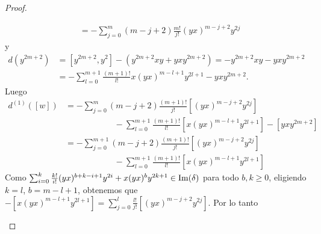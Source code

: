 \documentclass[fleqn,../tesis.tex]{subfiles}
\begin{document}
\begin{proof}
\begin{itemize}
\begin{align*}
				&= -\sum_{j = 0}^m(m - j + 2)\frac{m!}{j!}(yx)^{m -j + 2}y^{2j}
			\end{align*}
			y
			\begin{align*}
				d(y^{2m + 2}) &= \left[y^{2m + 2}, y^2\right] - (y^{2m +2}xy + yxy^{2m + 2}) = - y^{2m +2}xy - yxy^{2m + 2} \\
				&= -\sum_{l = 0}^{m + 1}\frac{(m + 1)!}{l!}x(yx)^{m - l + 1}y^{2l + 1} - yxy^{2m + 2}.
			\end{align*}
			Luego
			\begin{align*}
				d^{(1)}(\left[w\right]) &=
					-\sum_{j = 0}^m(m - j + 2)\frac{(m + 1)!}{j!}\left[(yx)^{m -j + 2}y^{2j}\right]\\
				&\hspace{70pt}-\sum_{l = 0}^{m + 1}\frac{(m + 1)!}{l!}\left[x(yx)^{m - l + 1}y^{2l + 1}\right]
						- \left[yxy^{2m + 2}\right]\\
				&= -\sum_{j = 0}^{m + 1}(m - j + 2)\frac{(m + 1)!}{j!}\left[(yx)^{m -j + 2}y^{2j}\right]\\
				& \hspace{70pt}-\sum_{l = 0}^{m + 1}\frac{(m + 1)!}{l!}\left[x(yx)^{m - l + 1}y^{2l + 1}\right]			
			\end{align*}
			Como $\sum_{i = 0}^k\frac{k!}{i!}(yx)^{b + k - i + 1}y^{2i} + x(yx)^by^{2k + 1} \in \operatorname{Im}(\delta)$
			para todo $b,k \geq 0$, eligiendo $k = l$, $b = m - l + 1$, obtenemos que
				$-\left[x(yx)^{m - l + 1}y^{2l + 1}\right]
					= \sum_{j = 0}^l\frac{l!}{j!}\left[(yx)^{m - j + 2}y^{2j}\right].$
			Por lo tanto
			

\end{itemize}
\end{proof}
\end{document}
